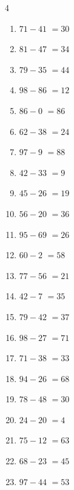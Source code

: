 \begin{multicols}{4}
\begin{enumerate}
  \item $71-41$
        $=30$

  \item $81-47$
        $=34$

  \item $79-35$
        $=44$

  \item $98-86$
        $=12$

  \item $86-0$
        $=86$

  \item $62-38$
        $=24$

  \item $97-9$
        $=88$

  \item $42-33$
        $=9$

  \item $45-26$
        $=19$

  \item $56-20$
        $=36$

  \item $95-69$
        $=26$

  \item $60-2$
        $=58$

\columnbreak %

  \item $77-56$
        $=21$

  \item $42-7$
        $=35$

  \item $79-42$
        $=37$

  \item $98-27$
        $=71$

  \item $71-38$
        $=33$

  \item $94-26$
        $=68$

  \item $78-48$
        $=30$

  \item $24-20$
        $=4$

  \item $75-12$
        $=63$

  \item $68-23$
        $=45$

  \item $97-44$
        $=53$


\end{enumerate}
\end{multicols}
